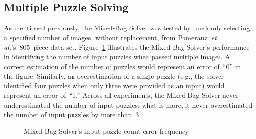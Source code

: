 \subsection{Multiple Puzzle Solving}

As mentioned previously, the Mixed-Bag Solver was tested by randomly selecting a specified number of images, without replacement, from Pomeranz~\textit{et al.}'s~805~piece data set.  Figure~\ref{fig:inputPuzzleCountErrorFrequency} illustrates the Mixed-Bag Solver's performance in identifying the number of input puzzles when passed multiple images.  A correct estimation of the number of puzzles would represent an error of~``0'' in the figure.  Similarly, an overestimation of a single puzzle (e.g., the solver identified four puzzles when only three were provided as an input) would represent an error of~``1.''  Across all experiments, the Mixed-Bag Solver never underestimated the number of input puzzles; what is more, it never overestimated the number of input puzzles by more than~3.  

\begin{figure}
\begin{center}
\end{center}
\caption{Mixed-Bag Solver's input puzzle count error frequency}
\label{fig:inputPuzzleCountErrorFrequency}
\end{figure}

